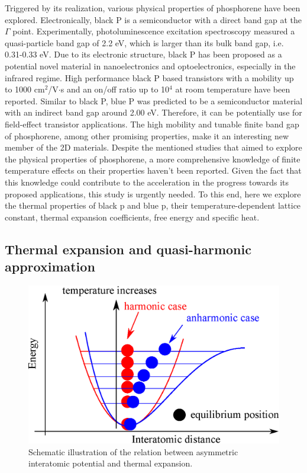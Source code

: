 Triggered by its realization, various physical properties of phosphorene have been explored. Electronically, black P is a semiconductor with a direct band gap at the $\Gamma$ point\cite{Zhu2014,deniz3}. Experimentally, photoluminescence excitation spectroscopy measured a quasi-particle band gap of 2.2 eV\cite{bp-ex-3}, which is larger than its bulk band gap, i.e. 0.31-0.33 eV\cite{Maruyama198199,Narita1983422}. Due to its electronic structure, black P has been proposed as a potential novel material in nanoelectronics and optoelectronics, especially in the infrared regime. High performance black P based transistors with a mobility up to 1000 cm$^2$/V$\cdot$s and an on/off ratio up to 10$^4$ at room temperature have been reported\cite{Li2014,Han2014}. Similar to black P, blue P was predicted to be a semiconductor material with an indirect band gap around 2.00 eV\cite{Zhu2014}. Therefore, it can be potentially use for field-effect transistor applications. The high mobility and tunable finite band gap of phosphorene, among other promising properties\cite{Jain2015,Wei2014,Kou2014,Tahir2015,zhou2014}, make it an interesting new member of the 2D materials. Despite the mentioned studies that aimed to explore the physical properties of phosphorene, a more comprehensive knowledge of finite temperature effects on their properties haven't been reported. Given the fact that this knowledge could contribute to the acceleration in the progress towards its proposed applications, this study\cite{Aierken2015.thermalP} is urgently needed. To this end, here we explore the thermal properties of black p and blue p, their temperature-dependent lattice constant, thermal expansion coefficients, free energy and specific heat.

\subsection{Thermal expansion and quasi-harmonic approximation}

\begin{figure}[htbp!] 
\centering
\includegraphics[width=0.8\linewidth]{anh_exp.eps}%
\caption{Schematic illustration of the relation between asymmetric interatomic potential and thermal expansion. }
\label{fig:anh_exp}
\end{figure}

